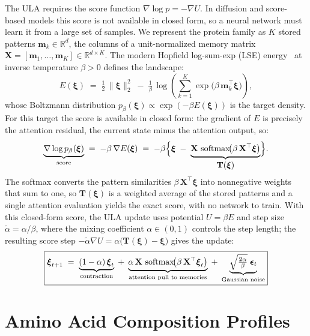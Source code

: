 \documentclass[10pt]{article}
\begin{document}
The ULA requires the score function $\nabla\log p = -\nabla U$. In
diffusion and score-based models this score is not available in closed form, so a neural
network must learn it from a large set of samples. We represent the protein family as $K$ stored patterns
$\mathbf{m}_k\in\mathbb{R}^d$, the columns of a unit-normalized memory matrix
$\mathbf{X} = [\mathbf{m}_1,\dots,\mathbf{m}_K]\in\mathbb{R}^{d\times K}$.
The modern Hopfield log-sum-exp (LSE) energy~\cite{ramsauerHopfieldNetworksAll2021} at inverse temperature $\beta>0$ defines the
landscape:
\[
  E(\boldsymbol{\xi})
  \;=\;
  \tfrac{1}{2}\,\|\boldsymbol{\xi}\|_2^2
  \;-\;
  \tfrac{1}{\beta}\,\log\!\left(\sum_{k=1}^{K}\exp\!\bigl(\beta\,\mathbf{m}_k^{\top}\boldsymbol{\xi}\bigr)\right),
\]
whose Boltzmann distribution $p_\beta(\boldsymbol{\xi})\propto\exp(-\beta E(\boldsymbol{\xi}))$ is the target density. For this target the score is available in closed form: the
gradient of $E$ is precisely the attention residual, the current state minus the attention output, so:
\[
  \underbrace{\nabla\log p_\beta(\boldsymbol{\xi})}_{\text{score}}
  \;=\;
  -\beta\,\nabla E(\boldsymbol{\xi})
  \;=\;
  -\beta\Bigl\{\boldsymbol{\xi} \;-\;
  \underbrace{\mathbf{X}\,\operatorname{softmax}\!\bigl(\beta\,\mathbf{X}^{\top}\boldsymbol{\xi}\bigr)}_{\textstyle\mathbf{T}(\boldsymbol{\xi})}\Bigr\}.
\]
The softmax converts the pattern similarities $\beta\,\mathbf{X}^{\top}\boldsymbol{\xi}$ into
nonnegative weights that sum to one, so $\mathbf{T}(\boldsymbol{\xi})$ is a weighted average of
the stored patterns and a single attention evaluation yields the exact score, with no network to train. With this closed-form score, the ULA update uses
potential $U=\beta E$ and step size $\tilde\alpha=\alpha/\beta$, where the mixing coefficient $\alpha\in(0,1)$ controls
the step length; the resulting score step
$-\tilde\alpha\nabla U = \alpha\bigl(\mathbf{T}(\boldsymbol{\xi})-\boldsymbol{\xi}\bigr)$
gives the update:
\[
  \boxed{%
  \boldsymbol{\xi}_{t+1}
  \;=\;
  \underbrace{(1-\alpha)\,\boldsymbol{\xi}_t}_{\text{contraction}}
  \;+\;
  \underbrace{\alpha\,\mathbf{X}\,\operatorname{softmax}\!\bigl(\beta\,\mathbf{X}^{\top}\boldsymbol{\xi}_t\bigr)}_{\text{attention pull to memories}}
  \;+\;
  \underbrace{\sqrt{\tfrac{2\alpha}{\beta}}\;\boldsymbol{\epsilon}_t}_{\text{Gaussian noise}}
  }
\]


\section{Amino Acid Composition Profiles}\label{si:aa-freq}
\end{document}
